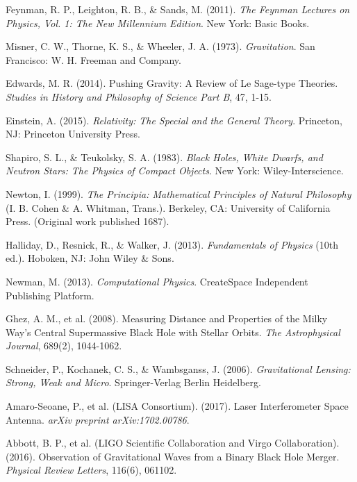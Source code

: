 \documentclass[pdflatex,sn-mathphys-num,referee]{sn-jnl}
\begin{document}
\begin{thebibliography}{99}
Feynman, R. P., Leighton, R. B., \& Sands, M. (2011). \textit{The Feynman Lectures on Physics, Vol. 1: The New Millennium Edition}. New York: Basic Books.

Misner, C. W., Thorne, K. S., \& Wheeler, J. A. (1973). \textit{Gravitation}. San Francisco: W. H. Freeman and Company.

Edwards, M. R. (2014). Pushing Gravity: A Review of Le Sage-type Theories. \textit{Studies in History and Philosophy of Science Part B}, 47, 1-15.

Einstein, A. (2015). \textit{Relativity: The Special and the General Theory}. Princeton, NJ: Princeton University Press.

Shapiro, S. L., \& Teukolsky, S. A. (1983). \textit{Black Holes, White Dwarfs, and Neutron Stars: The Physics of Compact Objects}. New York: Wiley-Interscience.

Newton, I. (1999). \textit{The Principia: Mathematical Principles of Natural Philosophy} (I. B. Cohen \& A. Whitman, Trans.). Berkeley, CA: University of California Press. (Original work published 1687).

Halliday, D., Resnick, R., \& Walker, J. (2013). \textit{Fundamentals of Physics} (10th ed.). Hoboken, NJ: John Wiley \& Sons.

Newman, M. (2013). \textit{Computational Physics}. CreateSpace Independent Publishing Platform.

Ghez, A. M., et al. (2008). Measuring Distance and Properties of the Milky Way's Central Supermassive Black Hole with Stellar Orbits. \textit{The Astrophysical Journal}, 689(2), 1044-1062.

Schneider, P., Kochanek, C. S., \& Wambsganss, J. (2006). \textit{Gravitational Lensing: Strong, Weak and Micro}. Springer-Verlag Berlin Heidelberg.

Amaro-Seoane, P., et al. (LISA Consortium). (2017). Laser Interferometer Space Antenna. \textit{arXiv preprint arXiv:1702.00786}.

Abbott, B. P., et al. (LIGO Scientific Collaboration and Virgo Collaboration). (2016). Observation of Gravitational Waves from a Binary Black Hole Merger. \textit{Physical Review Letters}, 116(6), 061102.


\end{thebibliography}
\end{document}

